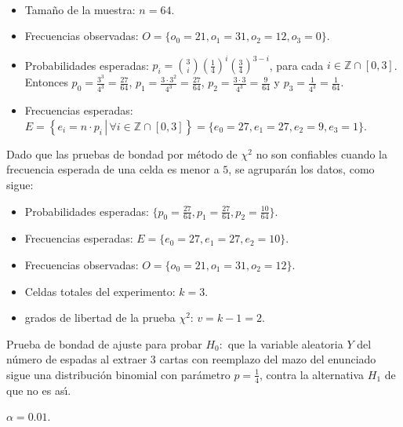 \begin{solucion}
 \begin{datos}
  $\phantom{0}$
  \begin{itemize}
   \item Tama\~no de la muestra: $n=64$.
   \item Frecuencias observadas: $O = \{o_0=21, o_1=31, o_2=12, o_3=0 \}$.
   \item Probabilidades esperadas: $p_i = 
   \binom{3}{i}\left(\frac{1}{4}\right)^i\left(\frac{3}{4}\right)^{3-i}$,
   para cada $i \in \mathbb{Z}\cap[0,3]$.
   Entonces $p_0 = \frac{3^3}{4^3} = \frac{27}{64}$,
   $p_1 = \frac{3\cdot 3^2}{4^3} = \frac{27}{64}$,
   $p_2 = \frac{3 \cdot 3}{4^3} = \frac{9}{64}$ y 
   $p_3 = \frac{1}{4^3} = \frac{1}{64}$.
   \item Frecuencias esperadas: $E = \left\{
   \left.e_i=n\cdot p_i\,\right|\,\forall i\in\mathbb{Z}\cap[0,3] \right\}
   = \{e_0 = 27, e_1 = 27, e_2 = 9, e_3 = 1 \}$.
  \end{itemize}
  Dado que las pruebas de bondad por m\'etodo de $\chi^2$ no son confiables
  cuando la frecuencia esperada de una celda es menor a $5$,
  se agrupar\'an los datos, como sigue:
  \begin{itemize}
   \item Probabilidades esperadas:
   $\{ p_0 = \frac{27}{64}, p_1 = \frac{27}{64}, p_2 = \frac{10}{64} \}$.
   \item Frecuencias esperadas: $E=\{e_0 = 27, e_1 = 27, e_2 = 10\}$.
   \item Frecuencias observadas: $O=\{o_0 = 21, o_1 = 31, o_2 = 12\}$.
   \item Celdas totales del experimento: $k=3$.
   \item grados de libertad de la prueba $\chi^2$: $v= k-1 = 2$.
  \end{itemize}
 \end{datos}
 
 \begin{hipotesis}
  Prueba de bondad de ajuste para probar $H_0:$
  que la variable aleatoria $Y$ del n\'umero de espadas
  al extraer $3$ cartas con reemplazo del mazo del enunciado
  sigue una distribuci\'on binomial con par\'ametro $p=\frac{1}{4}$,
  contra la alternativa $H_1$ de que no es as\'{\i}.
 \end{hipotesis}

 \begin{significancia}
  $\alpha = 0.01$.
 \end{significancia}


\end{solucion}
